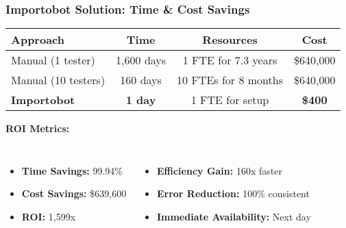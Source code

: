 \begin{frame}
\frametitle{Importobot Solution: Time \& Cost Savings}
\begin{center}
\begin{tabular}{|l|c|c|c|}
\hline
\textbf{Approach} & \textbf{Time} & \textbf{Resources} & \textbf{Cost} \\
\hline
Manual (1 tester) & 1,600 days & 1 FTE for 7.3 years & \$640,000 \\
\hline
Manual (10 testers) & 160 days & 10 FTEs for 8 months & \$640,000 \\
\hline
\textbf{Importobot} & \textbf{1 day} & 1 FTE for setup & \textbf{\$400} \\
\hline
\end{tabular}
\end{center}

\textbf{ROI Metrics:}
\begin{columns}
\begin{itemize}
    \item \textbf{Time Savings:} 99.94\%
    \item \textbf{Cost Savings:} \$639,600
    \item \textbf{ROI:} 1,599x
\end{itemize}

\begin{itemize}
    \item \textbf{Efficiency Gain:} 160x faster
    \item \textbf{Error Reduction:} 100\% consistent
    \item \textbf{Immediate Availability:} Next day
\end{itemize}
\end{columns}
\end{frame}

